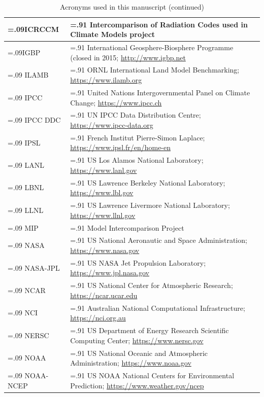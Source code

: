 \documentclass[gmd, preprint]{copernicus}
\begin{document}
\addtocounter{table}{-1}
\begin{table}[htp]
\renewcommand{\arraystretch}{2}
\scriptsize
\centering
\caption{Acronyms used in this manuscript (continued)}
\resizebox{\textwidth}{!} {
	\begin{tabularx}{1\textwidth} { 
	  | >{\raggedright\arraybackslash\hsize=.09\hsize}X
	  | >{\centering\arraybackslash\hsize=.91\hsize}X | }
\hline
ICRCCM & Intercomparison of Radiation Codes used in Climate Models project\\ \hline
IGBP & International Geosphere-Biosphere Programme (closed in 2015; \url{http://www.igbp.net}\\ \hline
ILAMB & ORNL International Land Model Benchmarking; \url{https://www.ilamb.org}\\ \hline
IPCC & United Nations Intergovernmental Panel on Climate Change; \url{https://www.ipcc.ch}\\ \hline
IPCC DDC & UN IPCC Data Distribution Centre; \url{https://www.ipcc-data.org}\\ \hline
IPSL & French Institut Pierre-Simon Laplace; \url{https://www.ipsl.fr/en/home-en}\\ \hline
LANL & US Los Alamos National Laboratory; \url{https://www.lanl.gov}\\ \hline
LBNL & US Lawrence Berkeley National Laboratory; \url{https://www.lbl.gov}\\ \hline
LLNL & US Lawrence Livermore National Laboratory; \url{https://www.llnl.gov}\\ \hline
MIP & Model Intercomparison Project\\ \hline
NASA & US National Aeronautic and Space Administration; \url{https://www.nasa.gov}\\ \hline
NASA-JPL & US NASA Jet Propulsion Laboratory; \url{https://www.jpl.nasa.gov}\\ \hline
NCAR & US National Center for Atmospheric Research; \url{https://ncar.ucar.edu}\\ \hline
NCI & Australian National Computational Infrastructure; \url{https://nci.org.au}\\ \hline
NERSC & US Department of Energy Research Scientific Computing Center; \url{https://www.nersc.gov}\\ \hline
NOAA & US National Oceanic and Atmospheric Administration; \url{https://www.noaa.gov}\\ \hline
NOAA-NCEP & US NOAA National Centers for Environmental Prediction; \url{https://www.weather.gov/ncep}\\ \hline

\end{tabularx}}
\end{table}
\end{document}
